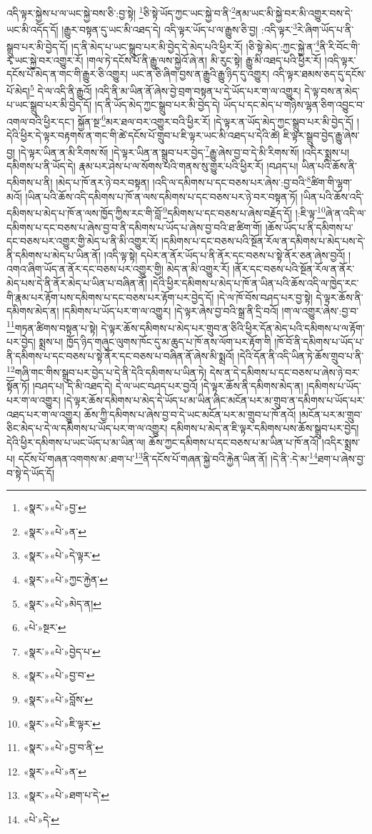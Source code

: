 འདི་ལྟར་སྐྱེས་པ་ལ་ཡང་སྐྱེ་བས་ཅི་:བྱ་སྟེ། \footnote{«སྣར་»«པེ་»བྱ་}ཅི་སྟེ་ཡོད་ཀྱང་ཡང་སྐྱེ་བ་ནི་\footnote{«སྣར་»«པེ་»ན་}ནམ་ཡང་མི་སྐྱེ་བར་མི་འགྱུར་བས་དེ་ཡང་མི་འདོད་དོ། །རྒྱུར་བསྟན་དུ་ཡང་མི་འཐད་དེ། འདི་ལྟར་ཡོད་པ་ལ་རྒྱུས་ཅི་བྱ། :འདི་ལྟར་\footnote{«སྣར་»«པེ་»དེ་ལྟར་}རེ་ཞིག་ཡོད་པ་ནི་སྒྲུབ་པར་མི་བྱེད་དོ། །ད་ནི་མེད་པ་ཡང་སྒྲུབ་པར་མི་བྱེད་དེ་མེད་པའི་ཕྱིར་རོ། །ཅི་སྟེ་མེད་:ཀྱང་སྐྱེ་ན་\footnote{«སྣར་»«པེ་»ཀྱང་རྐྱེན་}ནི་རི་བོང་གི་རྭ་ཡང་སྐྱེ་བར་འགྱུར་རོ། །གལ་ཏེ་དངོས་པོ་ནི་རྒྱུ་ལས་སྐྱེའོ་ཞེ་ན། མི་རུང་སྟེ། རྒྱུ་མི་འཐད་པའི་ཕྱིར་རོ། །འདི་ལྟར་དངོས་པོ་མེད་ན་གང་གི་རྒྱུར་ཅི་འགྱུར། ཡང་ན་ཅི་ཞིག་བྱས་ན་རྒྱུའི་རྒྱུ་ཉིད་དུ་འགྱུར། འདི་ལྟར་ཐམས་ཅད་དུ་དངོས་པོ་མེད།\footnote{«སྣར་»«པེ་»མེད་ན།} དེ་ལ་འདི་ནི་རྒྱུའོ། །འདི་ནི་མ་ཡིན་ནོ་ཞེས་བྱེ་བྲག་བསྟན་པ་དེ་ཡོད་པར་ག་ལ་འགྱུར། དེ་ལྟ་བས་ན་མེད་པ་ཡང་སྒྲུབ་པར་མི་བྱེད་དོ། །ད་ནི་ཡོད་མེད་ཀྱང་སྒྲུབ་པར་མི་བྱེད་དེ། ཡོད་པ་དང་མེད་པ་གཉིས་ལྷན་ཅིག་འབྱུང་བ་འགལ་བའི་ཕྱིར་དང་། སྐྱོན་སྔ་\footnote{«པེ་»སྔར་}མར་ཐལ་བར་འགྱུར་བའི་ཕྱིར་རོ། །དེ་ལྟར་ན་ཡོད་མེད་ཀྱང་སྒྲུབ་པར་མི་བྱེད་དོ། །དེའི་ཕྱིར་དེ་ལྟར་བརྟགས་ན་གང་གི་ཚེ་དངོས་པོ་གྲུབ་པ་ཇི་ལྟར་ཡང་མི་འཐད་པ་དེའི་ཚེ། ཇི་ལྟར་སྒྲུབ་བྱེད་རྒྱུ་ཞེས་བྱ། །དེ་ལྟར་ཡིན་ན་མི་རིགས་སོ། །དེ་ལྟར་ཡིན་ན་སྒྲུབ་པར་བྱེད་\footnote{«སྣར་»«པེ་»བྱེད་པ་}རྒྱུ་ཞེས་བྱ་བ་དེ་མི་རིགས་སོ། །འདིར་སྨྲས་པ། དམིགས་པ་ནི་ཡོད་དེ། རྣམ་པར་ཤེས་པ་ལ་སོགས་པའི་གནས་སུ་གྱུར་པའི་ཕྱིར་རོ། །བཤད་པ། ཡིན་པའི་ཆོས་ནི་དམིགས་པ་ནི། །མེད་པ་ཁོ་ནར་ཉེ་བར་བསྟན། །འདི་ལ་དམིགས་པ་དང་བཅས་པར་ཞེས་:བྱ་བའི་\footnote{«སྣར་»«པེ་»བྱ་བ་}ཚིག་གི་ལྷག་མའོ། །ཡིན་པའི་ཆོས་འདི་དམིགས་པ་ཁོ་ན་ལས་དམིགས་པ་དང་བཅས་པར་ཉེ་བར་བསྟན་ཏོ། །ཡིན་པའི་ཆོས་འདི་དམིགས་པ་མེད་པ་ཁོ་ན་ལས་ཁྱོད་ཀྱིས་རང་གི་བློ་\footnote{«སྣར་»«པེ་»བློས་}དམིགས་པ་དང་བཅས་པ་ཞེས་བརྗོད་དོ། །:ཇི་ལྟ་\footnote{«སྣར་»«པེ་»ཇི་ལྟར་}ཞེ་ན་འདི་ལ་དམིགས་པ་དང་བཅས་པ་ཞེས་བྱ་བ་ནི་དམིགས་པ་ཡོད་པ་ཞེས་བྱ་བའི་ཐ་ཚིག་གོ། །ཆོས་ཡོད་པ་ནི་དམིགས་པ་དང་བཅས་པར་འགྱུར་གྱི་མེད་པ་ནི་མི་འགྱུར་རོ། །དམིགས་པ་དང་བཅས་པའི་སྔོན་རོལ་ན་དམིགས་པ་མེད་པས་དེ་ནི་དམིགས་པ་མེད་པ་ཡིན་ནོ། །འདི་ལྟ་སྟེ། དཔེར་ན་ནོར་ཡོད་པ་ནི་ནོར་དང་བཅས་པ་སྟེ་ནོར་ཅན་ཞེས་བྱའོ། །འགའ་ཞིག་ཡོད་ན་ནོར་དང་བཅས་པར་འགྱུར་གྱི། མེད་ན་མི་འགྱུར་རོ། །ནོར་དང་བཅས་པའི་སྔོན་རོལ་ན་ནོར་མེད་པས་དེ་ནི་ནོར་མེད་པ་ཡིན་པ་བཞིན་ནོ། །དེའི་ཕྱིར་དམིགས་པ་མེད་པ་ཁོ་ན་ཡིན་པའི་ཆོས་འདི་ལ་ཁྱེད་རང་གི་རྣམ་པར་རྟོག་པས་དམིགས་པ་དང་བཅས་པར་རྟོག་པར་བྱེད་དོ། །དེ་ལ་ཁོ་བོས་བཤད་པར་བྱ་སྟེ། དེ་ལྟར་ཆོས་ནི་དམིགས་མེད་ན། །དམིགས་པ་ཡོད་པར་ག་ལ་འགྱུར། །དེ་ལྟར་ཞེས་བྱ་བའི་སྒྲ་ནི་དྲི་བའོ། །ག་ལ་འགྱུར་ཞེས་:བྱ་བ་\footnote{«སྣར་»«པེ་»བྱ་བ་ནི་}གཏན་ཚིགས་བསྟན་པ་སྟེ། དེ་ལྟར་ཆོས་དམིགས་པ་མེད་པར་གྲུབ་ན་ཅིའི་ཕྱིར་དོན་མེད་པའི་དམིགས་པ་ལ་རྟོག་པར་བྱེད། སྨྲས་པ། ཁྱོད་ཉིད་གཞུང་ལུགས་ཁོང་དུ་མ་ཆུད་པ་ཁོ་ནས་ལོག་པར་རྟོག་གི །ཁོ་བོ་ནི་དམིགས་པ་ཡོད་པ་ནི་དམིགས་པ་དང་བཅས་པ་སྟེ་ནོར་དང་བཅས་པ་བཞིན་ནོ་ཞེས་མི་སྨྲའོ། །དེའི་དོན་ནི་འདི་ཡིན་ཏེ་ཆོས་གྲུབ་པ་ནི་\footnote{«སྣར་»«པེ་»ན་}གཞི་གང་གིས་སྒྲུབ་པར་བྱེད་པ་དེ་ནི་དེའི་དམིགས་པ་ཡིན་ཏེ། དེས་ན་དེ་དམིགས་པ་དང་བཅས་པ་ཞེས་ཉེ་བར་སྟོན་ཏོ། །བཤད་པ། དེ་མི་འཐད་དེ། དེ་ལ་ཡང་བཤད་པར་བྱའོ། །དེ་ལྟར་ཆོས་ནི་དམིགས་མེད་ན། །དམིགས་པ་ཡོད་པར་ག་ལ་འགྱུར། །དེ་ལྟར་ཆོས་དམིགས་པ་མེད་དེ་ཡོད་པ་མ་ཡིན་ཞིང་མངོན་པར་མ་གྲུབ་ན་དམིགས་པ་ཡོད་པར་འཐད་པར་ག་ལ་འགྱུར། ཆོས་ཀྱི་དམིགས་པ་ཞེས་བྱ་བ་དེ་ཡང་མངོན་པར་མ་གྲུབ་པ་ཁོ་ནའོ། །མངོན་པར་མ་གྲུབ་ཅིང་མེད་པ་དེ་ལ་དམིགས་པ་ཡོད་པར་ག་ལ་འགྱུར། དམིགས་པ་མེད་ན་ཇི་ལྟར་དམིགས་པས་ཆོས་སྒྲུབ་པར་བྱེད། དེའི་ཕྱིར་དམིགས་པ་ཡང་ཡོད་པ་མ་ཡིན་ལ། ཆོས་ཀྱང་དམིགས་པ་དང་བཅས་པ་མ་ཡིན་པ་ཁོ་ནའོ། །འདིར་སྨྲས་པ། དངོས་པོ་གཞན་འགགས་མ་:ཐག་པ་\footnote{«སྣར་»«པེ་»ཐག་པ་དེ་}ནི་དངོས་པོ་གཞན་སྐྱེ་བའི་རྐྱེན་ཡིན་ནོ། །དེ་ནི་:དེ་མ་\footnote{«པེ་»དེ་}ཐག་པ་ཞེས་བྱ་བ་སྟེ་དེ་ཡོད་དོ། 